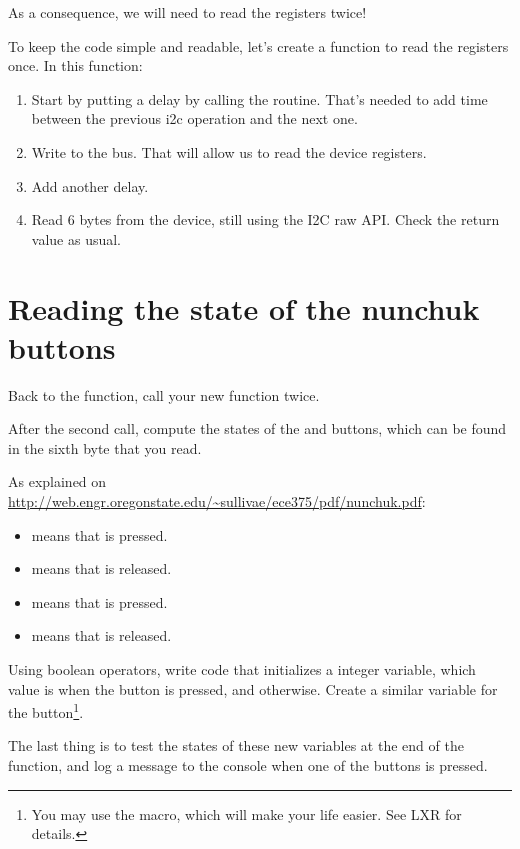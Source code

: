 As a consequence, we will need to read the registers twice!

To keep the code simple and readable, let's create a
 function to read the registers once.
In this function:

\begin{enumerate}
\item Start by putting a  delay by calling the
       routine. That's needed to add time between the
      previous i2c operation and the next one.
\item Write  to the bus. That will allow us to read
      the device registers.
\item Add another  delay.
\item Read 6 bytes from the device, still using the I2C raw API.
      Check the return value as usual.
\end{enumerate}

\section{Reading the state of the nunchuk buttons}

Back to the  function, call your new function twice.

After the second call, compute the states of the  and 
buttons, which can be found in the sixth byte that you read.

As explained on
\url{http://web.engr.oregonstate.edu/~sullivae/ece375/pdf/nunchuk.pdf}:

\begin{itemize}
\item {} means that  is pressed.
\item {} means that  is released.
\item {} means that  is pressed.
\item {} means that  is released.
\end{itemize}

Using boolean operators, write code that initializes a 
integer variable, which value is  when the  button is
pressed, and  otherwise. Create a similar 
variable for the  button\footnote{You may use the 
macro, which will make your life easier. See LXR for details.}.

The last thing is to test the states of these new variables at the end
of the  function, and log a message to the console
when one of the buttons is pressed.

